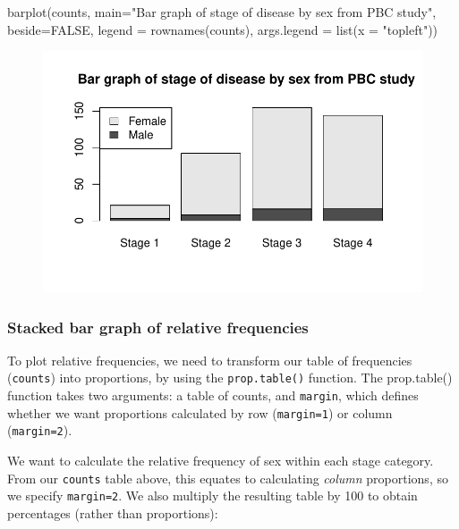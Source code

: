 \documentclass[
  a4paper,
]{memoir}
\newenvironment{Shaded}{\begin{snugshade}}{\end{snugshade}}
\newcommand{\AttributeTok}[1]{\textcolor[rgb]{0.00,0.00,0.00}{#1}}
\newcommand{\ConstantTok}[1]{\textcolor[rgb]{0.00,0.00,0.00}{#1}}
\newcommand{\FunctionTok}[1]{\textcolor[rgb]{0.00,0.00,0.00}{#1}}
\newcommand{\NormalTok}[1]{\textcolor[rgb]{0.00,0.00,0.00}{#1}}
\newcommand{\StringTok}[1]{\textcolor[rgb]{0.00,0.00,0.00}{#1}}
\begin{document}
\begin{Shaded}
\begin{Highlighting}[]
\FunctionTok{barplot}\NormalTok{(counts, }\AttributeTok{main=}\StringTok{"Bar graph of stage of disease by sex from PBC study"}\NormalTok{,}
        \AttributeTok{beside=}\ConstantTok{FALSE}\NormalTok{, }\AttributeTok{legend =} \FunctionTok{rownames}\NormalTok{(counts), }\AttributeTok{args.legend =} \FunctionTok{list}\NormalTok{(}\AttributeTok{x =} \StringTok{"topleft"}\NormalTok{))}
\end{Highlighting}
\end{Shaded}

\begin{figure}[H]

{\centering \includegraphics{01-intro_files/figure-pdf/unnamed-chunk-104-1.pdf}

}

\end{figure}

\hypertarget{stacked-bar-graph-of-relative-frequencies-1}{%
\subsubsection{Stacked bar graph of relative
frequencies}\label{stacked-bar-graph-of-relative-frequencies-1}}

To plot relative frequencies, we need to transform our table of
frequencies (\texttt{counts}) into proportions, by using the
\texttt{prop.table()} function. The prop.table() function takes two
arguments: a table of counts, and \texttt{margin}, which defines whether
we want proportions calculated by row (\texttt{margin=1}) or column
(\texttt{margin=2}).

We want to calculate the relative frequency of sex within each stage
category. From our \texttt{counts} table above, this equates to
calculating \emph{column} proportions, so we specify \texttt{margin=2}.
We also multiply the resulting table by 100 to obtain percentages
(rather than proportions):
\end{document}

